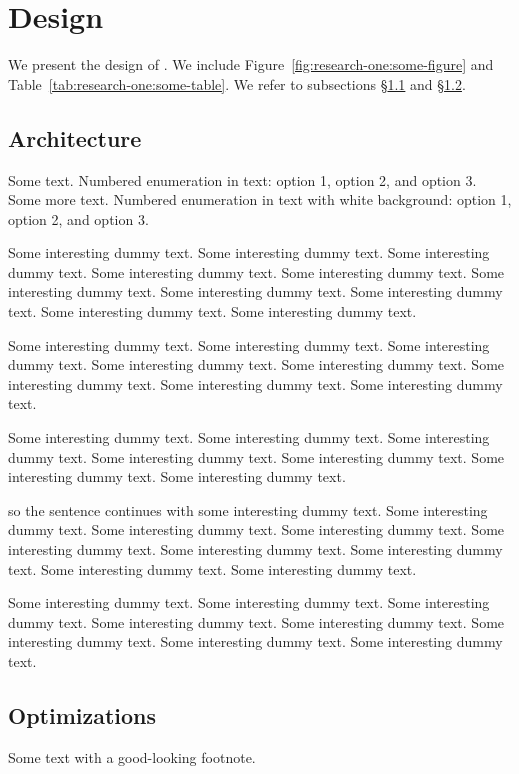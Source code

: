 \section{Design}
\label{sec:research-one:design}

We present the design of \oursystem. We include Figure~\ref{fig:research-one:some-figure} and Table~\ref{tab:research-one:some-table}. We refer to subsections \S\ref{subsec:research-one:architecture} and \S\ref{subsec:research-one:optimizations}.


\subsection{Architecture}
\label{subsec:research-one:architecture}

Some text. Numbered enumeration in text:  option 1,  option 2, and  option 3. Some more text. Numbered enumeration in text with white background:  option 1,  option 2, and  option 3.

Some interesting dummy text. Some interesting dummy text. Some interesting dummy text. Some interesting dummy text. Some interesting dummy text. Some interesting dummy text. Some interesting dummy text. Some interesting dummy text. Some interesting dummy text. Some interesting dummy text.

Some interesting dummy text. Some interesting dummy text. Some interesting dummy text. Some interesting dummy text. Some interesting dummy text. Some interesting dummy text. Some interesting dummy text. Some interesting dummy text.

Some interesting dummy text. Some interesting dummy text. Some interesting dummy text. Some interesting dummy text. Some interesting dummy text. Some interesting dummy text. Some interesting dummy text.

 so the sentence continues with some interesting dummy text. Some interesting dummy text. Some interesting dummy text. Some interesting dummy text. Some interesting dummy text. Some interesting dummy text. Some interesting dummy text. Some interesting dummy text. Some interesting dummy text.

Some interesting dummy text. Some interesting dummy text. Some interesting dummy text. Some interesting dummy text. Some interesting dummy text. Some interesting dummy text. Some interesting dummy text. Some interesting dummy text.





\subsection{Optimizations}
\label{subsec:research-one:optimizations}

Some text with a good-looking footnote.



